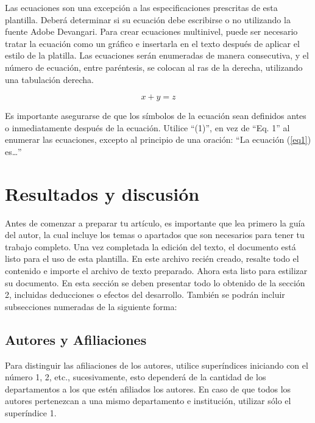     Las ecuaciones son una excepción a las especificaciones prescritas de esta plantilla. 
    Deberá determinar si su ecuación debe escribirse o no utilizando la fuente Adobe Devangari. 
    Para crear ecuaciones multinivel, puede ser necesario tratar la ecuación como un gráfico e insertarla en el texto después de aplicar el estilo de la platilla.
    Las ecuaciones serán enumeradas de manera consecutiva, y el número de ecuación, entre paréntesis, se colocan al ras de la derecha, utilizando una tabulación derecha. 
    
    \begin{equation}
        \label{eq1}
        x + y = z 
    \end{equation}
    
    Es importante asegurarse de que los símbolos de la ecuación sean definidos antes o inmediatamente después de la ecuación. Utilice “(1)”, en vez de “Eq. 1” al enumerar las ecuaciones, excepto al principio de una oración: “La ecuación (\ref{eq1}) es…”
    
    \section{Resultados y discusión}
    
    Antes de comenzar a preparar tu artículo, es importante que lea primero la guía del autor, la cual incluye los temas o apartados que son necesarios para tener tu trabajo completo.
    Una vez completada la edición del texto, el documento está listo para el uso de esta plantilla. En este archivo recién creado, resalte todo el contenido e importe el archivo de texto preparado. Ahora esta listo para estilizar su documento.
    En esta sección se deben presentar todo lo obtenido de la sección 2, incluidas deducciones o efectos del desarrollo. También se podrán incluir subsecciones numeradas de la siguiente forma:
    
    
    \newpage
    \label{anexo:fotosDeEvidencia}
    
    
    \subsection{Autores y Afiliaciones}
    
    Para distinguir las afiliaciones de los autores, utilice superíndices iniciando con el número 1, 2, etc., sucesivamente, esto dependerá de la cantidad de los departamentos a los que estén afiliados los autores. En caso de que todos los autores pertenezcan a una mismo departamento e institución, utilizar sólo el superíndice 1. 
    
